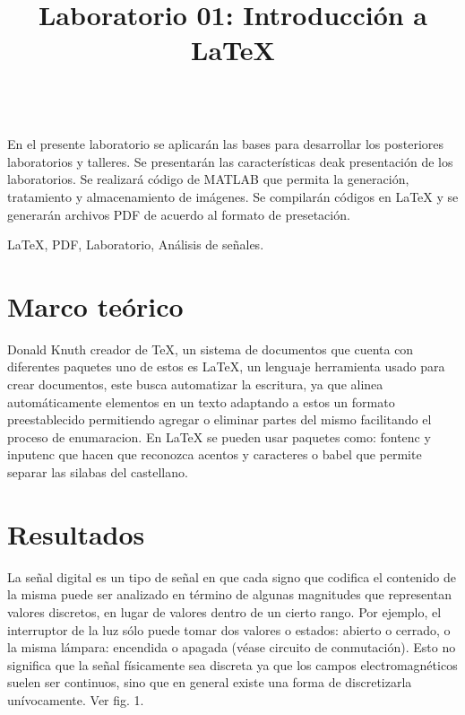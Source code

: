 \documentclass[conference,compsoc,onecolumn]{IEEEtran}
\begin{document}
\title{\normalfont Laboratorio 01: Introducción a \LaTeX{}}
\author{
}


 \maketitle
\IEEEoverridecommandlockouts
\IEEEpeerreviewmaketitle
    \\
\normalfont  \flushleft En el presente laboratorio se aplicarán las bases para desarrollar los posteriores laboratorios y talleres. Se presentarán las características deak presentación de los laboratorios. Se realizará código de MATLAB que permita la generación, tratamiento y almacenamiento de imágenes. Se compilarán códigos en \LaTeX{} y se generarán archivos
PDF de acuerdo al formato de presetación.



\begin{IEEEkeywords}
  \normalfont  \LaTeX{}, PDF, Laboratorio, Análisis de señales.
\end{IEEEkeywords}


\section{\normalfont Marco teórico}
\label{sec:introduction}
Donald Knuth creador de \TeX{}, un sistema de documentos que cuenta con diferentes paquetes uno de estos es \LaTeX{}, un lenguaje herramienta usado para crear documentos,  este busca automatizar la escritura, ya que alinea automáticamente elementos en un texto adaptando a estos un formato preestablecido permitiendo agregar o eliminar partes del mismo facilitando el proceso de enumaracion. En \LaTeX{} se pueden usar paquetes como: {fontenc} y {inputenc} que hacen que reconozca acentos y caracteres o {babel} que permite separar las silabas del castellano.

\section{\normalfont Resultados}
\label{sec:results}
La señal digital es un tipo de señal en que cada signo que codifica el contenido de la misma puede ser analizado
en término de algunas magnitudes que representan valores discretos, en lugar de valores dentro de un cierto rango.
Por ejemplo, el interruptor de la luz sólo puede tomar dos valores o estados: abierto o cerrado, o la misma lámpara:
encendida o apagada (véase circuito de conmutación). Esto no significa que la señal físicamente sea discreta ya que los
campos electromagnéticos suelen ser continuos, sino que en general existe una forma de discretizarla unívocamente.
Ver fig. 1.
\end{document}
